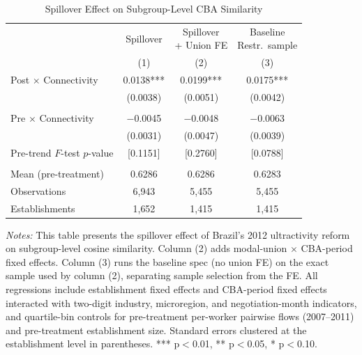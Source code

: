 \documentclass[12pt,letterpaper]{article}
\begin{document}
\begin{table}[H]
\centering
\caption{Spillover Effect on Subgroup-Level CBA Similarity}
\label{tab:subgroup_similarity}
\scriptsize
\begin{threeparttable}
\begin{tabular}{l ccc}
\toprule\toprule
 & Spillover & \shortstack{Spillover\\+ Union FE} & \shortstack{Baseline\\Restr.\ sample} \\
 & (1) & (2) & (3) \\
\midrule
Post $\times$ Connectivity & 0.0138*** & 0.0199*** & 0.0175*** \\
  & (0.0038) & (0.0051) & (0.0042) \\
 & & & \\
Pre $\times$ Connectivity & $-$0.0045 & $-$0.0048 & $-$0.0063 \\
  & (0.0031) & (0.0047) & (0.0039) \\
Pre-trend $F$-test $p$-value & [0.1151] & [0.2760] & [0.0788] \\
 & & & \\
Mean (pre-treatment) & 0.6286 & 0.6286 & 0.6283 \\
Observations & 6{,}943 & 5{,}455 & 5{,}455 \\
Establishments & 1{,}652 & 1{,}415 & 1{,}415 \\
\bottomrule
\end{tabular}
\scriptsize
\begin{tablenotes}
\item \textit{Notes:} This table presents the spillover effect of Brazil's 2012 ultractivity reform on subgroup-level cosine similarity. Column (2) adds modal-union $\times$ CBA-period fixed effects. Column (3) runs the baseline spec (no union FE) on the exact sample used by column (2), separating sample selection from the FE. All regressions include establishment fixed effects and CBA-period fixed effects interacted with two-digit industry, microregion, and negotiation-month indicators, and quartile-bin controls for pre-treatment per-worker pairwise flows (2007--2011) and pre-treatment establishment size. Standard errors clustered at the establishment level in parentheses. *** p$<$0.01, ** p$<$0.05, * p$<$0.10.
\end{tablenotes}
\end{threeparttable}
\end{table}
\clearpage
\end{document}

